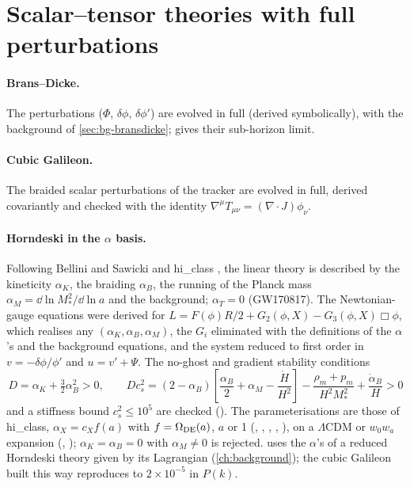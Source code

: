 \section{Scalar--tensor theories with full perturbations}\label{sec:ext-scalartensor}

\paragraph*{Brans--Dicke.} The perturbations ($\Phi$, $\delta\phi$, $\delta\phi'$) are evolved in full (derived
symbolically), with the background of \cref{sec:bg-bransdicke};  gives their sub-horizon limit.

\paragraph*{Cubic Galileon.} The braided scalar perturbations of the tracker are evolved in full, derived covariantly
and checked with the identity $\nabla^\mu T_{\mu\nu}=(\nabla\cdot J)\phi_\nu$.

\paragraph*{Horndeski in the $\alpha$ basis.} Following Bellini and Sawicki \cite{Bellini2014} and hi\_class
\cite{Zumalacarregui2017}, the linear theory is described by the kineticity $\alpha_K$, the braiding $\alpha_B$, the
running of the Planck mass $\alpha_M=\dd\ln M_*^2/\dd\ln a$ and the background; $\alpha_T=0$ (GW170817). The
Newtonian-gauge equations were derived for $L=F(\phi)R/2+G_2(\phi,X)-G_3(\phi,X)\Box\phi$, which realises any
$(\alpha_K,\alpha_B,\alpha_M)$, the $G_i$ eliminated with the definitions of the $\alpha$'s and the background
equations, and the system reduced to first order in $v=-\delta\phi/\phi'$ and $u=v'+\Psi$. The no-ghost and gradient
stability conditions
\begin{equation}
D=\alpha_K+\tfrac32\alpha_B^2>0,\qquad
Dc_s^2=(2-\alpha_B)\left[\frac{\alpha_B}{2}+\alpha_M-\frac{\dot H}{H^2}\right]-\frac{\rho_m+p_m}{H^2M_*^2}+\frac{\dot\alpha_B}{H}>0
\end{equation}
and a stiffness bound $c_s^2\le10^5$ are checked (). The parameterisations are those of
hi\_class, $\alpha_X=c_X f(a)$ with $f=\Omega_{\rm DE}(a)$, $a$ or 1 (, ,
, , ), on a $\Lambda$CDM or $w_0w_a$ expansion (,
); $\alpha_K=\alpha_B=0$ with $\alpha_M\neq0$ is rejected.  uses the $\alpha$'s of a
reduced Horndeski theory given by its Lagrangian (\cref{ch:background}); the cubic Galileon built this way reproduces
 to $2\times10^{-5}$ in $P(k)$.

